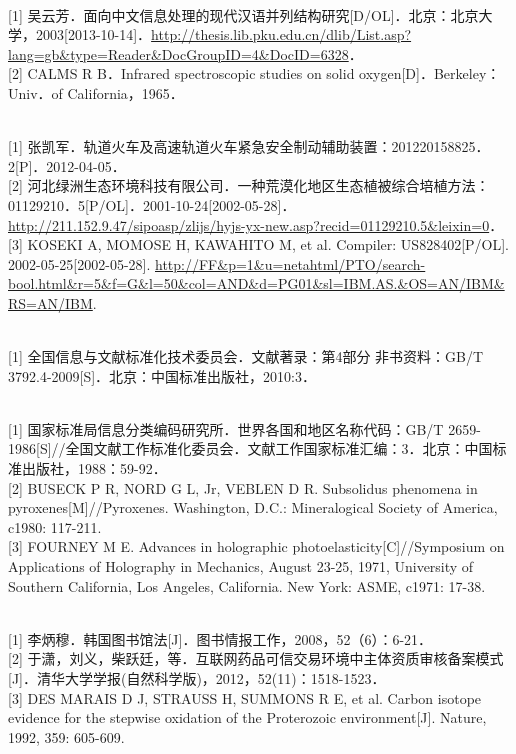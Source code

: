 \documentclass[UTF8,zihao=-4,twoside,openany]{ctexbook}
\begin{document}
{\vspace{0.4cm}
\\
{[1]} 吴云芳．面向中文信息处理的现代汉语并列结构研究[D/OL]．北京：北京大学，2003[2013-10-14]．\url{http://thesis.lib.pku.edu.cn/dlib/List.asp?lang=gb&type=Reader&DocGroupID=4&DocID=6328}．\\
{[2]} CALMS R B．Infrared spectroscopic studies on solid oxygen[D]．Berkeley：Univ．of California，1965．

\vspace{0.4cm}
\\
{[1]} 张凯军．轨道火车及高速轨道火车紧急安全制动辅助装置：201220158825．2[P]．2012-04-05．\\
{[2]} 河北绿洲生态环境科技有限公司．一种荒漠化地区生态植被综合培植方法：01129210．5[P/OL]．2001-10-24[2002-05-28]．\url{http://211.152.9.47/sipoasp/zlijs/hyjs-yx-new.asp?recid=01129210.5&leixin=0}．\\
{[3]} KOSEKI A, MOMOSE H, KAWAHITO M, et al. Compiler: US828402[P/OL]. 2002-05-25[2002-05-28]. \url{http://FF&p=1&u=netahtml/PTO/search-bool.html&r=5&f=G&l=50&col=AND&d=PG01&sl=IBM.AS.&OS=AN/IBM&RS=AN/IBM}.

\vspace{0.4cm}
\\
{[1]} 全国信息与文献标准化技术委员会．文献著录：第4部分 非书资料：GB/T 3792.4-2009[S]．北京：中国标准出版社，2010:3．

\vspace{0.4cm}
\\
{[1]} 国家标准局信息分类编码研究所．世界各国和地区名称代码：GB/T 2659-1986[S]//全国文献工作标准化委员会．文献工作国家标准汇编：3．北京：中国标准出版社，1988：59-92．\\
{[2]} BUSECK P R, NORD G L, Jr, VEBLEN D R. Subsolidus phenomena in pyroxenes[M]//Pyroxenes. Washington, D.C.: Mineralogical Society of America, c1980: 117-211. \\
{[3]} FOURNEY M E. Advances in holographic photoelasticity[C]//Symposium on Applications of Holography in Mechanics, August 23-25, 1971, University of Southern California, Los Angeles, California. New York: ASME, c1971: 17-38.

\vspace{0.4cm}
\\
{[1]} 李炳穆．韩国图书馆法[J]．图书情报工作，2008，52（6）：6-21．\\
{[2]} 于潇，刘义，柴跃廷，等．互联网药品可信交易环境中主体资质审核备案模式[J]．清华大学学报(自然科学版)，2012，52(11)：1518-1523．\\
{[3]} DES MARAIS D J, STRAUSS H, SUMMONS R E, et al. Carbon isotope evidence for the stepwise oxidation of the Proterozoic environment[J]. Nature, 1992, 359: 605-609.

}
\end{document}
